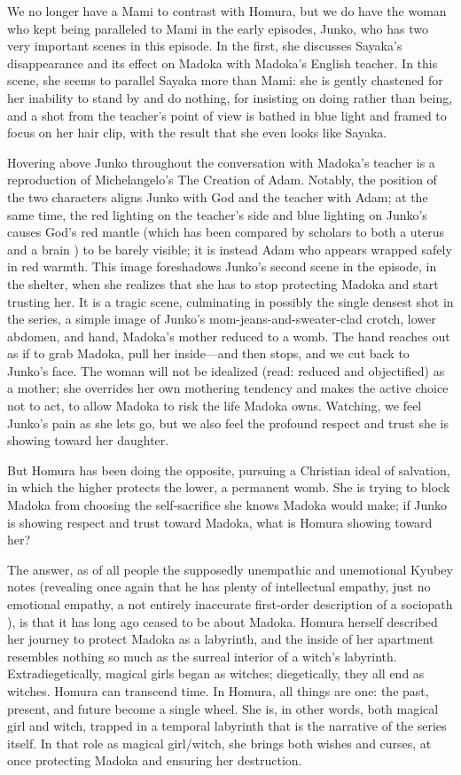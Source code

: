 We no longer have a Mami to contrast with Homura, but we do have the woman who kept being paralleled to Mami in the early episodes, Junko, who has two very important scenes in this episode. In the first, she discusses Sayaka's disappearance and its effect on Madoka with Madoka's English teacher. In this scene, she seems to parallel Sayaka more than Mami: she is gently chastened for her inability to stand by and do nothing, for insisting on doing rather than being, and a shot from the teacher's point of view is bathed in blue light and framed to focus on her hair clip, with the result that she even looks like Sayaka. 

Hovering above Junko throughout the conversation with Madoka's teacher is a reproduction of Michelangelo's The Creation of Adam. Notably, the position of the two characters aligns Junko with God and the teacher with Adam; at the same time, the red lighting on the teacher's side and blue lighting on Junko's causes God's red mantle (which has been compared by scholars to both a uterus \cite{ref82} and a brain \cite{ref83}) to be barely visible; it is instead Adam who appears wrapped safely in red warmth. This image foreshadows Junko's second scene in the episode, in the shelter, when she realizes that she has to stop protecting Madoka and start trusting her. It is a tragic scene, culminating in possibly the single densest shot in the series, a simple image of Junko's mom-jeans-and-sweater-clad crotch, lower abdomen, and hand, Madoka's mother reduced to a womb. The hand reaches out as if to grab Madoka, pull her inside—and then stops, and we cut back to Junko's face. The woman will not be idealized (read: reduced and objectified) as a mother; she overrides her own mothering tendency and makes the active choice not to act, to allow Madoka to risk the life Madoka owns. Watching, we feel Junko's pain as she lets go, but we also feel the profound respect and trust she is showing toward her daughter.

But Homura has been doing the opposite, pursuing a Christian ideal of salvation, in which the higher protects the lower, a permanent womb. She is trying to block Madoka from choosing the self-sacrifice she knows Madoka would make; if Junko is showing respect and trust toward Madoka, what is Homura showing toward her?

The answer, as of all people the supposedly unempathic and unemotional Kyubey notes (revealing once again that he has plenty of intellectual empathy, just no emotional empathy, a not entirely inaccurate first-order description of a sociopath \cite{ref84}), is that it has long ago ceased to be about Madoka. Homura herself described her journey to protect Madoka as a labyrinth, and the inside of her apartment resembles nothing so much as the surreal interior of a witch's labyrinth. Extradiegetically, magical girls began as witches; diegetically, they all end as witches. Homura can transcend time. In Homura, all things are one: the past, present, and future become a single wheel. She is, in other words, both magical girl and witch, trapped in a temporal labyrinth that is the narrative of the series itself. In that role as magical girl/witch, she brings both wishes and curses, at once protecting Madoka and ensuring her destruction. 

